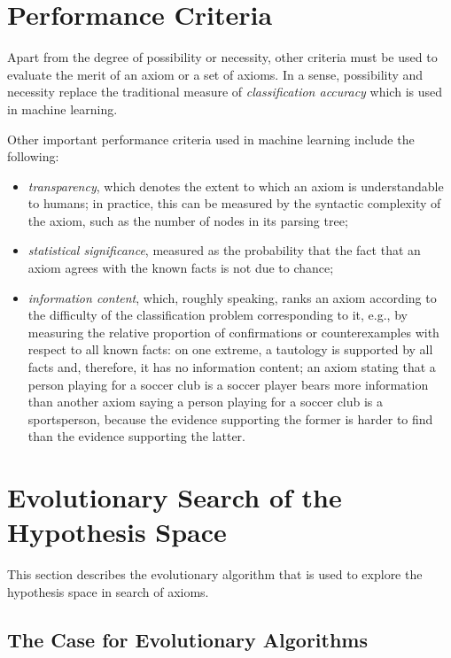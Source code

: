 \documentclass[a4paper]{article}
\newcounter{ex}
\begin{document}
\section{Performance Criteria}

Apart from the degree of possibility or necessity, other criteria must be used to
evaluate the merit of an axiom or a set of axioms. In a sense, possibility and
necessity replace the traditional measure of \emph{classification accuracy} which
is used in machine learning.

Other important performance criteria used in machine learning include the following:
\begin{itemize}
\item \emph{transparency}, which denotes the extent to which an axiom is understandable
  to humans; in practice, this can be measured by the syntactic complexity of the axiom,
  such as the number of nodes in its parsing tree;
\item \emph{statistical significance}, measured as the probability
  that the fact that an axiom agrees with the known facts is not due to chance;
\item \emph{information content}, which, roughly speaking, ranks an axiom according
  to the difficulty of the classification problem corresponding to it, e.g., by
  measuring the relative proportion of confirmations or counterexamples with respect
  to all known facts: on one extreme, a tautology is supported by all facts and,
  therefore, it has no information content; an axiom stating that
  a person playing for a soccer club is a soccer player bears more information
  than another axiom saying a person playing for a soccer club is a sportsperson,
  because the evidence supporting the former is harder to find than the evidence
  supporting the latter.
\end{itemize}

\section{Evolutionary Search of the Hypothesis Space}
\label{EA}

This section describes the evolutionary algorithm that is used to explore
the hypothesis space in search of axioms.

\subsection{The Case for Evolutionary Algorithms}
\end{document}
